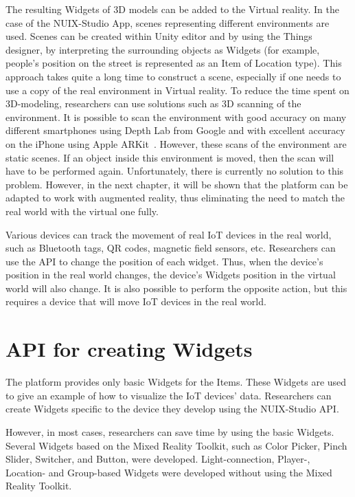 The resulting Widgets of 3D models can be added to the Virtual reality. In the case of the NUIX-Studio App, scenes representing different environments are used. Scenes can be created within Unity editor and by using the Things designer, by interpreting the surrounding objects as Widgets (for example, people's position on the street is represented as an Item of Location type). This approach takes quite a long time to construct a scene, especially if one needs to use a copy of the real environment in Virtual reality. To reduce the time spent on 3D-modeling, researchers can use solutions such as 3D scanning of the environment. It is possible to scan the environment with good accuracy on many different smartphones using Depth Lab from Google and with excellent accuracy on the iPhone using Apple ARKit~\cite{baek_two-dimensional_2020, breitbarth_measurement_2019}. However, these scans of the environment are static scenes. If an object inside this environment is moved, then the scan will have to be performed again. Unfortunately, there is currently no solution to this problem. However, in the next chapter, it will be shown that the platform can be adapted to work with augmented reality, thus eliminating the need to match the real world with the virtual one fully.

Various devices can track the movement of real IoT devices in the real world, such as Bluetooth tags, QR codes, magnetic field sensors, etc. Researchers can use the API to change the position of each widget. Thus, when the device's position in the real world changes, the device's Widgets position in the virtual world will also change. It is also possible to perform the opposite action, but this requires a device that will move IoT devices in the real world.


\section{API for creating Widgets}

The platform provides only basic Widgets for the Items. These Widgets are used to give an example of how to visualize the IoT devices' data. Researchers can create Widgets specific to the device they develop using the NUIX-Studio API.

However, in most cases, researchers can save time by using the basic Widgets. Several Widgets based on the Mixed Reality Toolkit, such as Color Picker, Pinch Slider, Switcher, and Button, were developed. Light-connection, Player-, Location- and Group-based Widgets were developed without using the Mixed Reality Toolkit.


